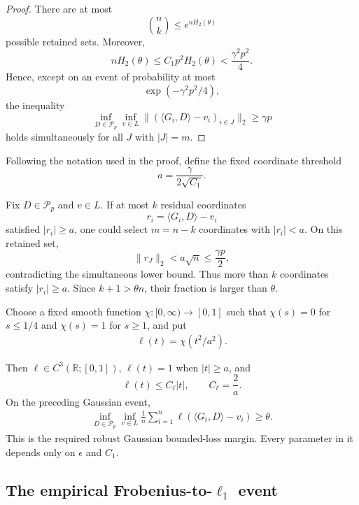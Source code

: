 \documentclass[11pt]{article}
\numberwithin{equation}{section}
\theoremstyle{definition}
\theoremstyle{remark}
\newcommand{\1}{\boldsymbol 1}
\begin{document}
\begin{aiblock}
\begin{proof}
    There are at most
    \[
        \binom{n}{k} \le e^{n H_2(\theta)}
    \]
    possible retained sets. Moreover,
    \[
        n H_2(\theta) \le C_1 p^2 H_2(\theta) < \frac{\gamma^2 p^2}{4}.
    \]
    Hence, except on an event of probability at most
    \[
        \exp\left(-\gamma^2 p^2 / 4\right),
    \]
    the inequality
    \[
        \inf_{D \in \mathcal P_p} \inf_{v \in L} \|(\langle G_i, D\rangle - v_i)_{i \in J}\|_2 \ge\gamma p
    \]
    holds simultaneously for all $J$ with $|J| = m$.
\end{proof}


Following the notation used in the proof, define the fixed coordinate threshold
\[
    a = \frac{\gamma}{2\sqrt{C_1}}.
\]

Fix $D \in \mathcal P_p$ and $v \in L$. If at most $k$ residual coordinates
\[
    r_i = \langle G_i, D\rangle - v_i
\]
satisfied $|r_i| \ge a$, one could select $m = n - k$ coordinates with $|r_i| < a$. On this retained set,
\[
    \|r_J\|_2 < a \sqrt n \le \frac{\gamma p}{2},
\]
contradicting the simultaneous lower bound. Thus more than $k$ coordinates satisfy $|r_i| \ge a$. Since $k + 1 > \theta n$, their fraction is larger than $\theta$.

Choose a fixed smooth function $\chi : [0,\infty) \to [0,1]$ such that $\chi(s) = 0$ for $s \le 1/4$ and $\chi(s) = 1$ for $s \ge 1$, and put
\begin{align}
    \ell(t) = \chi(t^2/a^2). \label{eq:infeasibility_above:smoothing}
\end{align}

Then $\ell \in C^3(\mathbb R; [0,1])$, $\ell(t)=1$ when $|t| \ge a$, and
\[
    \ell(t) \le C_\ell|t|, \qquad C_\ell = \frac{2}{a}.
\]
On the preceding Gaussian event,
\begin{align}
    \inf_{D \in \mathcal P_p} \inf_{v \in L} \frac{1}{n} \sum_{i = 1}^n \ell(\langle G_i, D\rangle - v_i) \ge \theta. \label{eq:infeasibility_above:smooth_lower_bound}
\end{align}
This is the required robust Gaussian bounded-loss margin. Every parameter in it depends only on $\epsilon$ and $C_1$.


\subsection{\texorpdfstring{The empirical
  Frobenius-to-$\ell_1$ event}{The empirical
  Frobenius-to-l1 event}}\label{the-empirical-frobenius-to-ell_1-event}


\end{aiblock}
\end{document}
